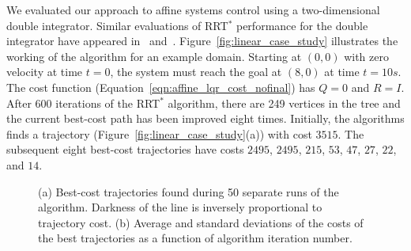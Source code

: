 \documentclass[letterpaper, 10pt, english, conference]{IEEEtran}
\begin{document}
We evaluated our approach to affine systems control using a
two-dimensional double integrator. Similar evaluations of RRT$^*$
performance for the double integrator have appeared
in~\cite{Karaman.Frazzoli:CDC10}
and~\cite{jur}. Figure~\ref{fig:linear_case_study} illustrates
the working of the algorithm for an example domain. Starting at
$(0,0)$ with zero velocity at time $t=0$, the system must reach the
goal at $(8,0)$ at time $t=10s$. The cost function
(Equation~\ref{eqn:affine_lqr_cost_nofinal}) has $Q=0$ and
$R=I$. After 600 iterations of the RRT$^*$ algorithm, there are 249
vertices in the tree and the current best-cost path has been improved
eight times. Initially, the algorithms finds a trajectory
(Figure~\ref{fig:linear_case_study}(a)) with cost $3515$. The
subsequent eight best-cost trajectories have costs $2495$, $2495$,
$215$, $53$, $47$, $27$, $22$, and $14$.

\begin{figure}
\begin{center}
  \begin{center}
  \end{center}
\end{center}
\caption{(a) Best-cost trajectories found during 50 separate runs of
  the algorithm. Darkness of the line is inversely proportional to
  trajectory cost. (b) Average and standard deviations of the costs of
  the best trajectories as a function of algorithm iteration number.}
\label{fig:linear_case_study2}
\end{figure}
\end{document}
